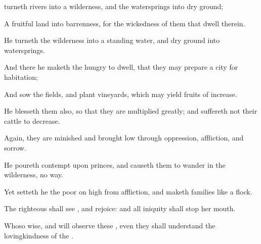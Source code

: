 {turneth
rivers into a
wilderness, and the
watersprings into dry
ground;
\par }{\Q {}A
fruitful
land into
barrenness, for the
wickedness of them that
dwell therein.
\par }{\Q {}He
turneth the
wilderness into a
standing
water, and
dry
ground into
watersprings.
\par }{\Q {}And there he maketh the
hungry to
dwell, that they may
prepare a
city for
habitation;
\par }{\Q {}And
sow the
fields, and
plant
vineyards, which may
yield
fruits of
increase.
\par }{\Q {}He
blesseth them also, so that they are
multiplied
greatly; and
suffereth not their
cattle to
decrease.
\par }{\Q {}Again, they are
minished and brought
low through
oppression,
affliction, and
sorrow.
\par }{\Q {}He
poureth
contempt upon
princes, and causeth them to
wander in the
wilderness,
{} no
way.
\par }{\Q {}Yet setteth he the
poor on
high from
affliction, and
maketh
{}
families like a
flock.
\par }{\Q {}The
righteous shall
see
{}, and
rejoice: and all
iniquity shall
stop her
mouth.
\par }{\Q {}Whoso
{}
wise, and will
observe these
{}, even they shall
understand the
lovingkindness of the
{}.

}
